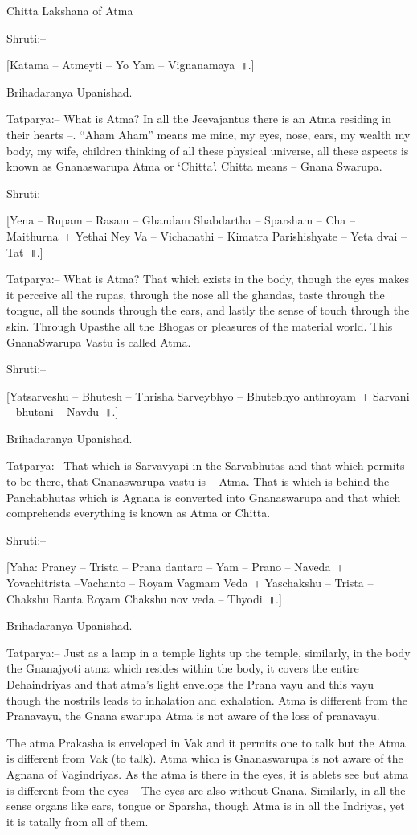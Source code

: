 Chitta Lakshana of Atma

Shruti:–

[Katama – Atmeyti – Yo Yam – Vignanamaya~॥.]

Brihadaranya Upanishad.

Tatparya:– What is Atma? In all the Jeevajantus there is an Atma residing in their hearts –. “Aham Aham” means me mine, my eyes, nose, ears, my wealth my body, my wife, children thinking of all these physical universe, all these aspects is known as Gnanaswarupa Atma or ‘Chitta’. Chitta means – Gnana Swarupa.

Shruti:–

[Yena – Rupam – Rasam – Ghandam Shabdartha – Sparsham – Cha – Maithurna~। Yethai Ney Va – Vichanathi – Kimatra Parishishyate – Yeta dvai – Tat~॥.]

Tatparya:– What is Atma? That which exists in the body, though the eyes makes it perceive all the rupas, through the nose all the ghandas, taste through the tongue, all the sounds through the ears, and lastly the sense of touch through the skin. Through Upasthe all the Bhogas or pleasures of the material world. This GnanaSwarupa Vastu is called Atma.

Shruti:–

[Yatsarveshu – Bhutesh – Thrisha Sarveybhyo – Bhutebhyo anthroyam~। Sarvani – bhutani – Navdu~॥.]

Brihadaranya Upanishad.

Tatparya:– That which is Sarvavyapi in the Sarvabhutas and that which permits to be there, that Gnanaswarupa vastu is – Atma. That is which is behind the Panchabhutas which is Agnana is converted into Gnanaswarupa and that which comprehends everything is known as Atma or Chitta.

Shruti:–

[Yaha: Praney – Trista – Prana dantaro – Yam – Prano – Naveda~। Yovachitrista –Vachanto – Royam Vagmam Veda~। Yaschakshu – Trista – Chakshu Ranta Royam Chakshu nov veda – Thyodi~॥.]

Brihadaranya Upanishad.

Tatparya:– Just as a lamp in a temple lights up the temple, similarly, in the body the Gnanajyoti atma which resides within the body, it covers the entire Dehaindriyas and that atma's light envelops the Prana vayu and this vayu though the nostrils leads to inhalation and exhalation. Atma is different from the Pranavayu, the Gnana swarupa Atma is not aware of the loss of pranavayu.

The atma Prakasha is enveloped in Vak and it permits one to talk but the Atma is different from Vak (to talk). Atma which is Gnanaswarupa is not aware of the Agnana of Vagindriyas. As the atma is there in the eyes, it is ablets see but atma is different from the eyes – The eyes are also without Gnana. Similarly, in all the sense organs like ears, tongue or Sparsha, though Atma is in all the Indriyas, yet it is tatally from all of them.

